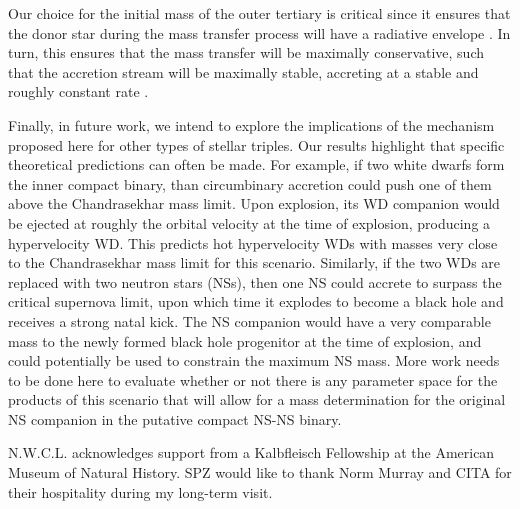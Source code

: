 \documentclass{aastex62}
\begin{document}
Our choice for the initial mass of the outer tertiary is critical since it
ensures that the donor star during the mass transfer process will have
a radiative envelope \citep[e.g.][]{maeder09}.  In turn, this ensures
that the mass transfer will be maximally conservative, such that the
accretion stream will be maximally stable, accreting at a stable and
roughly constant rate \citep[e.g.][]{iben91}.

Finally, in future work, we intend to explore the implications of the mechanism proposed here for other types of stellar triples.  Our results highlight that specific theoretical predictions can often be made.  For example, if two white dwarfs form the inner compact binary, than circumbinary accretion could push one of them above the Chandrasekhar mass limit.  Upon explosion, its WD companion would be ejected at roughly the orbital velocity at the time of explosion, producing a hypervelocity WD.  This predicts hot hypervelocity WDs with masses very close to the Chandrasekhar mass limit for this scenario.  Similarly, if the two WDs are replaced with two neutron stars (NSs), then one NS could accrete to surpass the critical supernova limit, upon which time it explodes to become a black hole and receives a strong natal kick.  The NS companion would have a very comparable mass to the newly formed black hole progenitor at the time of explosion, and could potentially be used to constrain the maximum NS mass.  More work needs to be done here to evaluate whether or not there is any parameter space for the products of this scenario that will allow for a mass determination for the original NS companion in the putative compact NS-NS binary.

\acknowledgments

N.W.C.L. acknowledges support from a Kalbfleisch Fellowship at the
American Museum of Natural History.  SPZ would like to thank Norm
Murray and CITA for their hospitality during my long-term visit.





%
% 
%      
\end{document}

